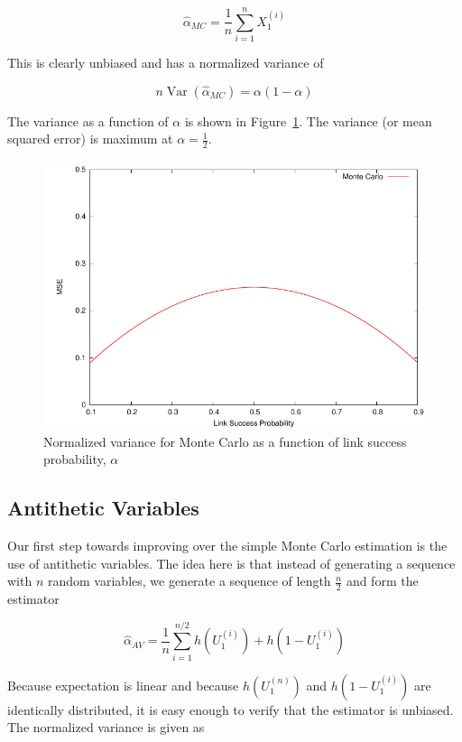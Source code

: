 \documentclass[11pt]{article}
\DeclareMathOperator{\var}{Var}
\begin{document}
\begin{equation}
\hat{\alpha}_{MC} = \frac{1}{n}\displaystyle\sum_{i=1}^{n}X_{1}^{(i)}
\end{equation}

This is clearly unbiased and has a normalized variance of

\begin{equation}
n\var\left(\hat{\alpha}_{MC}\right) = \alpha(1-\alpha)
\end{equation}

The variance as a function of $\alpha$ is shown in Figure~\ref{fig:mc}. The variance (or mean squared error) is maximum at $\alpha = \frac{1}{2}$.
\begin{figure}[ht!]
\centering
\includegraphics[width=0.75\columnwidth]{img/monte_carlo}
\caption{Normalized variance for Monte Carlo as a function of link success probability, $\alpha$}\label{fig:mc}
\end{figure}

\subsection{Antithetic Variables}
Our first step towards improving over the simple Monte Carlo estimation is the use of antithetic variables\cite{ross}. The idea here is that instead of generating a sequence with $n$ random variables, we generate a sequence of length $\frac{n}{2}$ and form the estimator

\begin{equation}
\hat{\alpha}_{AV} = \frac{1}{n}\displaystyle\sum_{i=1}^{n/2}h(U_{1}^{(i)})+h(1 - U_{1}^{(i)})
\end{equation}

Because expectation is linear and because $h(U_{1}^{(n)})$ and $h(1-U_{1}^{(i)})$ are identically distributed, it is easy enough to verify that the estimator is unbiased. The normalized variance is given as
\end{document}

